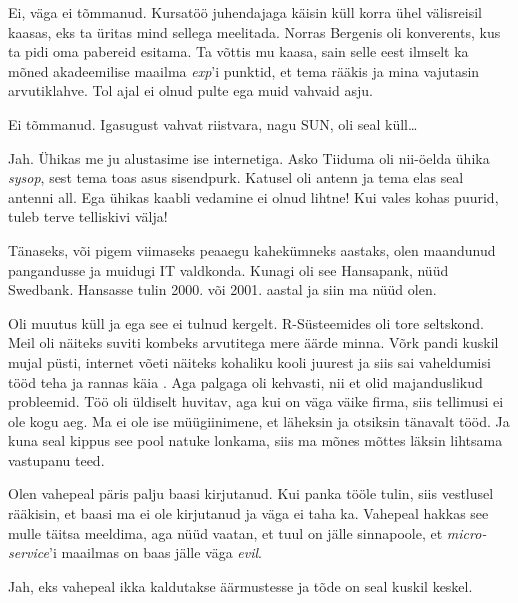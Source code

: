 
Ei, väga ei tõmmanud. Kursatöö juhendajaga käisin küll korra ühel 
välisreisil kaasas, eks ta üritas mind sellega meelitada. Norras 
Bergenis oli konverents, kus ta pidi oma pabereid esitama. Ta võttis mu kaasa, sain selle 
eest ilmselt ka mõned akadeemilise maailma \emph{exp}'i punktid, et tema rääkis ja mina vajutasin 
arvutiklahve. Tol ajal ei olnud pulte ega muid vahvaid asju. 


Ei tõmmanud. Igasugust vahvat riistvara, 
nagu SUN, oli seal küll\ldots 


Jah. Ühikas me ju alustasime ise internetiga. Asko 
Tiiduma oli nii-öelda ühika \emph{sysop}, sest tema 
toas asus sisendpurk. Katusel oli antenn ja tema elas seal antenni 
all. Ega ühikas kaabli vedamine ei olnud lihtne! Kui vales kohas puurid, tuleb terve telliskivi välja!


Tänaseks, või pigem viimaseks peaaegu kahekümneks aastaks, olen maandunud 
pangandusse ja muidugi IT valdkonda. Kunagi oli see Hansapank, 
nüüd Swedbank. Hansasse tulin 2000. või 2001. aastal ja siin ma nüüd olen.


Oli muutus küll ja ega see ei tulnud kergelt. R-Süsteemides oli tore 
seltskond. Meil oli näiteks suviti kombeks arvutitega 
mere äärde minna. Võrk pandi kuskil mujal püsti, internet võeti näiteks kohaliku kooli juurest ja siis sai vaheldumisi tööd teha ja rannas käia . Aga palgaga oli kehvasti, nii et olid majanduslikud probleemid. Töö oli üldiselt 
huvitav, aga kui on väga väike firma, siis tellimusi ei ole kogu aeg. Ma ei 
ole ise müügiinimene, et läheksin ja otsiksin tänavalt tööd. Ja kuna seal 
kippus see pool natuke lonkama, siis ma mõnes mõttes läksin 
lihtsama vastupanu teed. 

Olen vahepeal päris palju baasi 
kirjutanud. Kui panka tööle tulin, siis vestlusel rääkisin, 
et baasi ma ei ole kirjutanud ja väga ei taha ka. Vahepeal hakkas 
see mulle täitsa meeldima, aga nüüd vaatan, et tuul on jälle sinnapoole, et \emph{micro-service}'i maailmas on baas jälle väga \emph{evil}. 


Jah, eks vahepeal ikka kaldutakse äärmustesse ja tõde on seal kuskil 
keskel.